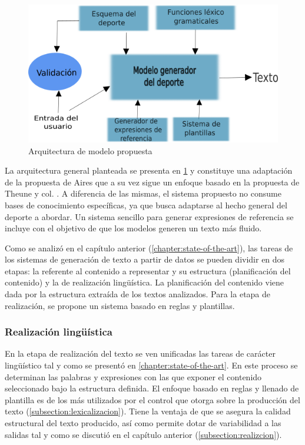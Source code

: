 \begin{figure}[!]
    \begin{center}
        \includegraphics[scale=0.9]{Graphics/arquitecturatesisOKFINAL.png}
    \end{center}
    \caption{Arquitectura de modelo propuesta}
    \label{arquitecturadelmodeloOK}
\end{figure}

    La arquitectura general planteada se presenta en \ref{arquitecturadelmodeloOK} y constituye una 
adaptación de la propuesta de Aires  que a su vez sigue un enfoque basado en la propuesta de Theune y col. . 
A diferencia de las mismas, el sistema propuesto no consume bases de conocimiento específicas, ya que busca adaptarse al hecho general del deporte a
abordar. Un sistema sencillo para generar expresiones de referencia se incluye con el objetivo de que los modelos generen un texto más fluido.

    Como se analizó en el capítulo anterior (\ref{chapter:state-of-the-art}), las tareas de los sistemas de generación de texto a partir de datos se pueden dividir en 
dos etapas: la referente al contenido a representar y su estructura (planificación del contenido) y la de realización lingüística. La planificación del contenido 
viene dada por la estructura extraída de los textos analizados. Para la etapa de realización, se propone un sistema basado en reglas y plantillas.

    \subsubsection{Realización lingüística}
 
    En la etapa de realización del texto se ven unificadas las tareas de carácter lingüístico tal y como se presentó en \ref{chapter:state-of-the-art}. 
En este proceso se determinan las palabras y expresiones con las que exponer el contenido seleccionado bajo la estructura definida. El enfoque basado en reglas 
y llenado de plantilla es de los más utilizados por el control que otorga sobre la producción del texto (\ref{subsection:lexicalizacion}). Tiene la ventaja de que 
se asegura la calidad estructural del texto producido, así como permite dotar de variabilidad a las salidas tal y como se discutió en el capítulo 
anterior (\ref{subsection:realizcion}).


